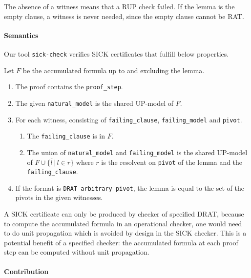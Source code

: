 \documentclass[
]{report}
\providecommand{\tightlist}{%
  \setlength{\itemsep}{0pt}\setlength{\parskip}{0pt}}
\begin{document}
The absence of a witness means that a RUP check failed. If the lemma is
the empty clause, a witness is never needed, since the empty clause
cannot be RAT.

\paragraph{Semantics}

Our tool \texttt{sick-check} verifies SICK certificates that fulfill
below properties.

Let \(F\) be the accumulated formula up to and excluding the lemma.

\begin{enumerate}
\def\labelenumi{\arabic{enumi}.}
\tightlist
\item
  The proof contains the \texttt{proof\_step}.
\item
  The given \texttt{natural\_model} is the shared UP-model of \(F\).
\item
  For each witness, consisting of \texttt{failing\_clause},
  \texttt{failing\_model} and \texttt{pivot}.

  \begin{enumerate}
  \def\labelenumii{\arabic{enumii}.}
  \tightlist
  \item
    The \texttt{failing\_clause} is in \(F\).
  \item
    The union of \texttt{natural\_model} and \texttt{failing\_model} is
    the shared UP-model of \(F \cup \{ \overline{l} \,|\, l \in r\}\)
    where \(r\) is the resolvent on \texttt{pivot} of the lemma and the
    \texttt{failing\_clause}.
  \end{enumerate}
\item
  If the format is \texttt{DRAT-arbitrary-pivot}, the lemma is equal to
  the set of the pivots in the given witnesses.
\end{enumerate}

A SICK certificate can only be produced by checker of specified DRAT,
because to compute the accumulated formula in an operational checker,
one would need to do unit propagation which is avoided by design in the
SICK checker. This is a potential benefit of a specified checker: the
accumulated formula at each proof step can be computed without unit
propagation.

\paragraph{Contribution}
\end{document}
